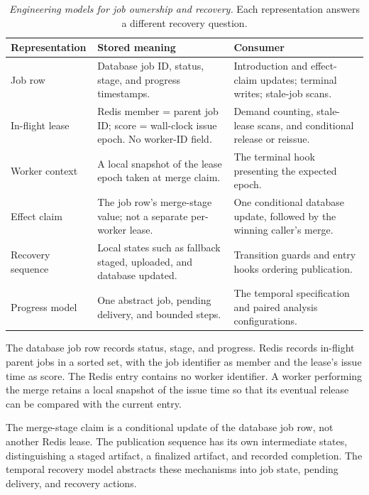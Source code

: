 {\footnotesize
\begin{longtable}{@{}p{.20\linewidth}p{.36\linewidth}p{.36\linewidth}@{}}
\caption[Engineering models for job ownership and recovery]{\emph{Engineering models for job ownership and recovery.} Each representation answers a different recovery question.}\label{handbook-job-recovery-models}\\
\toprule
\textbf{Representation} & \textbf{Stored meaning} & \textbf{Consumer} \\
\midrule\endhead
Job row & Database job ID, status, stage, and progress timestamps. & Introduction and effect-claim updates; terminal writes; stale-job scans. \\
In-flight lease & Redis member = parent job ID; score = wall-clock issue epoch. No worker-ID field. & Demand counting, stale-lease scans, and conditional release or reissue. \\
Worker context & A local snapshot of the lease epoch taken at merge claim. & The terminal hook presenting the expected epoch. \\
Effect claim & The job row's merge-stage value; not a separate per-worker lease. & One conditional database update, followed by the winning caller's merge. \\
Recovery sequence & Local states such as fallback staged, uploaded, and database updated. & Transition guards and entry hooks ordering publication. \\
Progress model & One abstract job, pending delivery, and bounded steps. & The temporal specification and paired analysis configurations. \\
\bottomrule
\end{longtable}
}


The database job row records status, stage, and progress. Redis records in-flight parent jobs in a sorted set, with the job identifier as member and the lease's issue time as score. The Redis entry contains no worker identifier. A worker performing the merge retains a local snapshot of the issue time so that its eventual release can be compared with the current entry.

The merge-stage claim is a conditional update of the database job row, not another Redis lease. The publication sequence has its own intermediate states, distinguishing a staged artifact, a finalized artifact, and recorded completion. The temporal recovery model abstracts these mechanisms into job state, pending delivery, and recovery actions.

